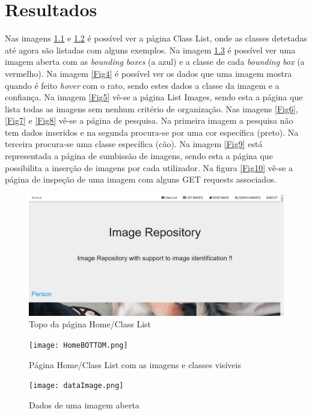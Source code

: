 \documentclass{report}
\begin{document}
\chapter{Resultados}
\label{chap.resultados}
Nas imagens \ref{Fig1} e \ref{Fig2} é possível ver a página Class List, onde as classes detetadas até agora são listadas com alguns exemplos. Na imagem \ref{Fig3} é possível ver uma imagem aberta com as \textit{bounding boxes} (a azul) e a classe de cada \textit{bounding box} (a vermelho). Na imagem \ref{Fig4} é possível ver os dados que uma imagem mostra quando é feito \textit{hover} com o rato, sendo estes dados a classe da imagem e a confiança. Na imagem \ref{Fig5} vê-se a página List Images, sendo esta a página que lista todas as imagens sem nenhum critério de organização. Nas imagens \ref{Fig6}, \ref{Fig7} e \ref{Fig8} vê-se a página de pesquisa. Na primeira imagem a pesquisa não tem dados inseridos e na segunda procura-se por uma cor específica (preto). Na terceira procura-se uma classe específica (cão). Na imagem \ref{Fig9} está representada a página de sumbissão de imagens, sendo esta a página que possibilita a inserção de imagens por cada utilizador. Na figura \ref{Fig10} vê-se a página de inspeção de uma imagem com alguns GET requests associados.

\begin{figure}[h]
\includegraphics[width=\textwidth]{HomeTOP.png}
\caption{Topo da página Home/Class List}
\label{Fig1}
\end{figure}

\begin{figure}[h]
\texttt{[image: HomeBOTTOM.png]}
\caption{Página Home/Class List com as imagens e classes visíveis}
\label{Fig2}
\end{figure}

\begin{figure}[h]
\texttt{[image: dataImage.png]}
\caption{Dados de uma imagem aberta}
\label{Fig3}
\end{figure}
\end{document}
